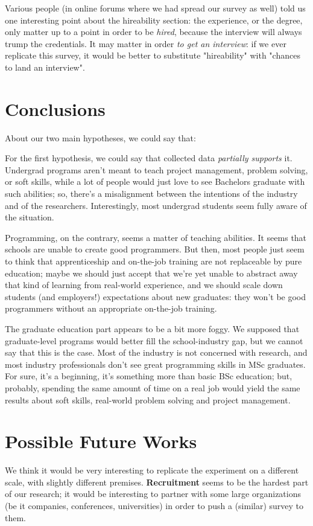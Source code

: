 \documentclass{sigchi}
\begin{document}
Various people (in online forums where we had spread our survey as well) told us one interesting point about the hireability section: the experience, or the degree, only matter up to a point in order to be \textit{hired}, because the interview will always trump the credentials. It may matter in order \textit{to get an interview}: if we ever replicate this survey, it would be better to substitute "hireability" with "chances to land an interview".

\section{Conclusions}

About our two main hypotheses, we could say that:

For the first hypothesis, we could say that collected data \textit{partially supports} it. Undergrad programs aren't meant to teach project management, problem solving, or soft skills, while a lot of people would just love to see Bachelors graduate with such abilities; so, there's a misalignment between the intentions of the industry and of the researchers. Interestingly, most undergrad students seem fully aware of the situation.

Programming, on the contrary, seems a matter of teaching abilities. It seems that schools are unable to create good programmers. But then, most people just seem to think that apprenticeship and on-the-job training are not replaceable by pure education; maybe we should just accept that we're yet unable to abstract away that kind of learning from real-world experience, and we should scale down students (and employers!) expectations about new graduates: they won't be good programmers without an appropriate on-the-job training.

The graduate education part appears to be a bit more foggy. We supposed that graduate-level programs would better fill the school-industry gap, but we cannot say that this is the case. Most of the industry is not concerned with research, and most industry professionals don't see great programming skills in MSc graduates. For sure, it's a beginning, it's something more than basic BSc education; but, probably, spending the same amount of time on a real job would yield the same results about soft skills, real-world problem solving and project management.

\section{Possible Future Works}
We think it would be very interesting to replicate the experiment on a different scale, with slightly different premises. \textbf{Recruitment} seems to be the hardest part of our research; it would be interesting to partner with some large organizations (be it companies, conferences, universities) in order to push a (similar) survey to them.
\end{document}
